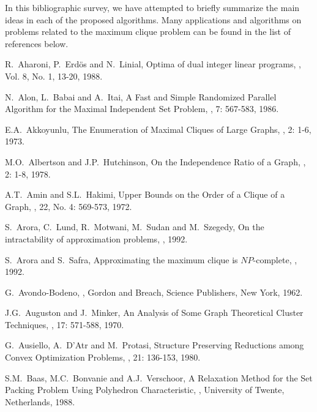 In this bibliographic survey, we have attempted to briefly summarize
the main ideas in each of the proposed algorithms. Many applications
and algorithms on problems related to the maximum clique problem can
be found in the list of references below.

%

\begin{thebibliography}{10}

R.~Aharoni, P.~Erd\"{o}s and N.~Linial,
\newblock Optima of dual integer linear programs,
, Vol. 8, No. 1, 13-20, 1988.

N.~Alon, L.~Babai and A.~Itai,
\newblock A Fast and Simple Randomized Parallel Algorithm for the
Maximal Independent Set Problem,
, 7: 567-583, 1986.

E.A.~Akkoyunlu,
\newblock The Enumeration of Maximal Cliques of Large Graphs,
, 2: 1-6, 1973.

M.O.~Albertson and J.P.~Hutchinson,
\newblock On the Independence Ratio of a Graph,
, 2: 1-8, 1978.

A.T.~Amin and S.L.~Hakimi,
\newblock Upper Bounds on the Order of a Clique of a Graph,
, 22, No. 4: 569-573, 1972.

S.~Arora, C.~Lund, R.~Motwani, M.~Sudan and M.~Szegedy,
\newblock On the intractability of approximation problems,
,
1992.

S.~Arora and S.~Safra,
\newblock Approximating the maximum clique is $NP$-complete,
,
1992.

G.~Avondo-Bodeno,
,
\newblock Gordon and Breach, Science Publishers, New York, 1962.

J.G.~Auguston and J.~Minker,
\newblock An Analysis of Some Graph Theoretical Cluster
Techniques,
, 17: 571-588, 1970.

G.~Ausiello, A.~D'Atr and M.~Protasi,
\newblock Structure Preserving Reductions among	Convex Optimization
Problems,
, 21: 136-153, 1980.

S.M.~Baas, M.C.~Bonvanie and A.J.~Verschoor,
\newblock A Relaxation Method for the Set Packing Problem Using
Polyhedron Characteristic,
, University of Twente,
Netherlands, 1988.


\end{thebibliography}
